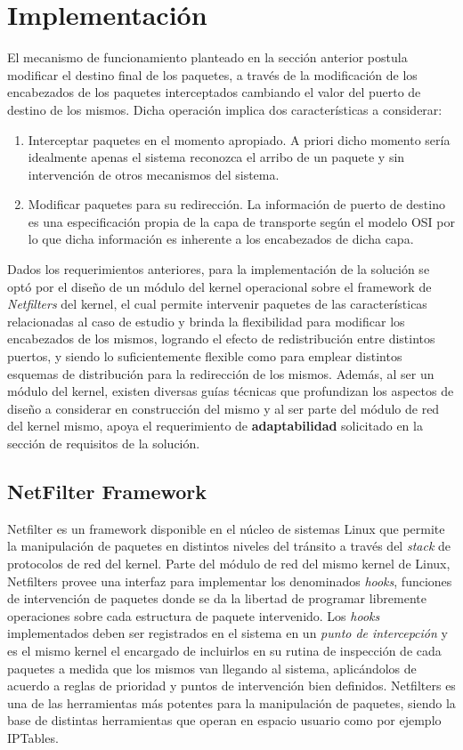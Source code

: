 \section{Implementación}
El mecanismo de funcionamiento planteado en la sección anterior postula modificar el destino final de los paquetes, a través de la modificación de los encabezados de los paquetes interceptados cambiando el valor del puerto de destino de los mismos. Dicha operación implica dos características a considerar:

\begin{enumerate}
\item Interceptar paquetes en el momento apropiado. A priori dicho momento sería idealmente apenas el sistema reconozca el arribo de un paquete y sin intervención de otros mecanismos del sistema.
\item Modificar paquetes para su redirección. La información de puerto de destino es una especificación propia de la capa de transporte según el modelo OSI por lo que dicha información es inherente a los encabezados de dicha capa.
\end{enumerate}

Dados los requerimientos anteriores, para la implementación de la solución se optó por el diseño de un módulo del kernel operacional sobre el framework de \emph{Netfilters} del kernel, el cual permite intervenir paquetes de las características relacionadas al caso de estudio y brinda la flexibilidad para modificar los encabezados de los mismos, logrando el efecto de redistribución entre distintos puertos, y siendo lo suficientemente flexible como para emplear distintos esquemas de distribución para la redirección de los mismos. Además, al ser un módulo del kernel, existen diversas guías técnicas que profundizan los aspectos de diseño a considerar en construcción del mismo y al ser parte del módulo de red del kernel mismo, apoya el requerimiento de \textbf{adaptabilidad} solicitado en la sección de requisitos de la solución.

\subsection{NetFilter Framework}
Netfilter \cite{report:netfilterModule} es un framework disponible en el núcleo de sistemas Linux que permite la manipulación de paquetes en distintos niveles del tránsito a través del \emph{stack} de protocolos de red del kernel. Parte del módulo de red del mismo kernel de Linux, Netfilters provee una interfaz para implementar los denominados \emph{hooks}, funciones de intervención de paquetes donde se da la libertad de programar libremente operaciones sobre cada estructura de paquete intervenido. Los \emph{hooks} implementados deben ser registrados en el sistema en un \emph{punto de intercepción} y es el mismo kernel el encargado de incluirlos en su rutina de inspección de cada paquetes a medida que los mismos van llegando al sistema, aplicándolos de acuerdo a reglas de prioridad y puntos de intervención bien definidos. Netfilters es una de las herramientas más potentes para la manipulación de paquetes, siendo la base de distintas herramientas que operan en espacio usuario como por ejemplo IPTables.

